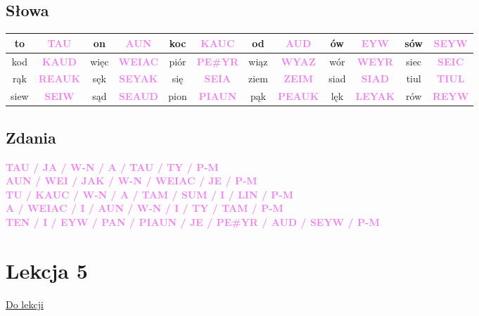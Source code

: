 \documentclass[12p, oneside]{book}
\newcommand{\steno}[1]{\textbf{\textsf{\textcolor{violet}{ #1}}}}
\begin{document}
\subsection*{Słowa}
\begin{tabular}{|c c|c c|c c|c c|c c|c c|}
	\hline
	to & \steno{TAU} & on & \steno{AUN} & koc & \steno{KAUC} & od & \steno{AUD} & ów & \steno{EYW} & sów & \steno{SEYW} \\ \hline
	kod & \steno{KAUD} & więc & \steno{WEIAC} & piór & \steno{PE\#YR} & wiąz & \steno{WYAZ} & wór & \steno{WEYR} & siec & \steno{SEIC} \\ \hline
	rąk & \steno{REAUK} & sęk & \steno{SEYAK} & się & \steno{SEIA} & ziem & \steno{ZEIM} & siad & \steno{SIAD} & tiul & \steno{TIUL} \\ \hline
	siew & \steno{SEIW} & sąd & \steno{SEAUD} & pion & \steno{PIAUN} & pąk & \steno{PEAUK} & lęk & \steno{LEYAK} & rów & \steno{REYW} \\ \hline
\end{tabular}

\subsection*{Zdania}

\steno{TAU / JA / W-N / A / TAU / TY / P-M } \\
\steno{AUN / WEI / JAK / W-N / WEIAC / JE / P-M } \\
\steno{TU / KAUC / W-N / A / TAM / SUM / I / LIN / P-M } \\
\steno{A / WEIAC / I / AUN / W-N / I / TY / TAM / P-M } \\
\steno{TEN / I / EYW / PAN / PIAUN / JE / PE\#YR / AUD / SEYW / P-M }

\section{Lekcja 5}
\hyperref[prakt:5]{Do lekcji}
\label{odp:5}
\end{document}

